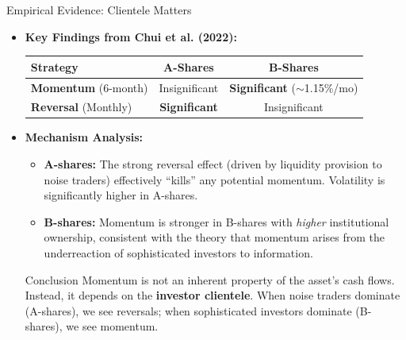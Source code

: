 \documentclass{beamer}
\begin{document}
\begin{frame}{Empirical Evidence: Clientele Matters}
	\begin{itemize}
		\item \textbf{Key Findings from Chui et al. (2022):}
		\begin{table}[h]
			\centering
			\small
			\begin{tabular}{lcc}
				\hline
				\textbf{Strategy} & \textbf{A-Shares} & \textbf{B-Shares} \\
				\hline
				\textbf{Momentum} (6-month) & Insignificant & \textbf{Significant} ($\sim$1.15\%/mo) \\
				\textbf{Reversal} (Monthly) & \textbf{Significant} & Insignificant \\
				\hline
			\end{tabular}
		\end{table}
		
		\item \textbf{Mechanism Analysis:}
		\begin{itemize}
			\item \textbf{A-shares:} The strong reversal effect (driven by liquidity provision to noise traders) effectively ``kills'' any potential momentum. Volatility is significantly higher in A-shares.
			\item \textbf{B-shares:} Momentum is stronger in B-shares with \textit{higher} institutional ownership, consistent with the theory that momentum arises from the underreaction of sophisticated investors to information.
		\end{itemize}
		
		\begin{block}{Conclusion}
			Momentum is not an inherent property of the asset's cash flows. Instead, it depends on the \textbf{investor clientele}. When noise traders dominate (A-shares), we see reversals; when sophisticated investors dominate (B-shares), we see momentum.
		\end{block}
	\end{itemize}
\end{frame}
\end{document}
